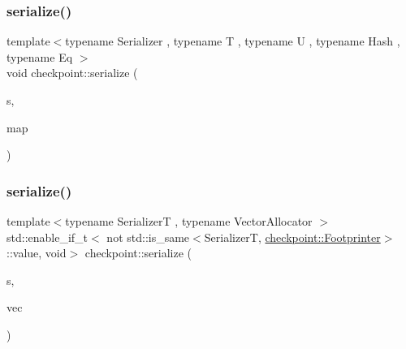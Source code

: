 \mbox{\label{namespacecheckpoint_aa77eeb7a036d253ef33ed2c9ef764a5e}} 
\subsubsection{\texorpdfstring{serialize()}{serialize()}\hspace{0.1cm}{\footnotesize\ttfamily [25/30]}}
{\footnotesize\ttfamily template$<$typename Serializer , typename T , typename U , typename Hash , typename Eq $>$ \\
void checkpoint\+::serialize (\begin{DoxyParamCaption}\item[{Serializer \&}]{s,  }\item[{std\+::unordered\+\_\+multimap$<$ T, U, Hash, Eq $>$ \&}]{map }\end{DoxyParamCaption})\hspace{0.3cm}{\ttfamily [inline]}}

\mbox{\label{namespacecheckpoint_a4dbdef848c92782b54888f6247f8e8ba}} 
\subsubsection{\texorpdfstring{serialize()}{serialize()}\hspace{0.1cm}{\footnotesize\ttfamily [26/30]}}
{\footnotesize\ttfamily template$<$typename SerializerT , typename Vector\+Allocator $>$ \\
std\+::enable\+\_\+if\+\_\+t$<$ not std\+::is\+\_\+same$<$SerializerT, \hyperlink{structcheckpoint_1_1_footprinter}{checkpoint\+::\+Footprinter}$>$\+::value, void$>$ checkpoint\+::serialize (\begin{DoxyParamCaption}\item[{SerializerT \&}]{s,  }\item[{std\+::vector$<$ bool, Vector\+Allocator $>$ \&}]{vec }\end{DoxyParamCaption})}

\mbox{\label{namespacecheckpoint_ae4ca8cbc6daf2f5a2a20d44d9fe1cc9f}} 
